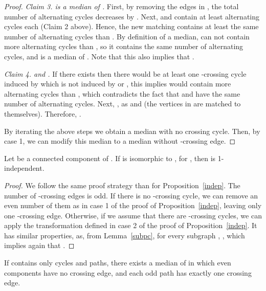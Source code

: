 \documentclass[10pt]{llncs}
\begin{document}
\begin{proof}
  {\smallskip\noindent\em Claim 3.  is a median of .}  First,
  by removing the edges in , the total number of
  alternating cycles decreases by . Next,  and 
  contain at least  alternating cycles each (Claim 2
  above). Hence, the new matching  contains at least the same
  number of alternating cycles than . By definition of a median,
   can not contain more alternating cycles than , so it
  contains the same number of alternating cycles, and is a median of
  . Note that this also implies that .
  
{\smallskip\noindent\em Claim 4.  and .}  If there exists 
  then there would be at least one -crossing cycle induced by 
  which is not induced by  or , this implies  would contain
  more alternating cycles than , which contradicts the fact
  that  and  have the same number of alternating cycles.
  Next, , as  and  (the vertices
  in  are matched to themselves). Therefore, .

  By iterating the above steps we obtain a median with no crossing
  cycle. Then, by case 1, we can modify this median to a median
  without -crossing edge. \end{proof}





\begin{proposition}\label{1dep}
  Let  be a connected component of . If  is isomorphic to
  , for , then  is 1-independent. 
\end{proposition}

\begin{proof}
  We follow the same proof strategy than for
  Proposition~\ref{indep}. The number of -crossing edges is odd. If
  there is no -crossing cycle, we can remove an even number of them
  as in case 1 of the proof of Proposition~\ref{indep}, leaving only
  one -crossing edge. Otherwise, if we assume that there are
  -crossing cycles, we can apply the transformation defined in case
  2 of the proof of Proposition~\ref{indep}. It has similar
  properties, as, from Lemma~\ref{subpc}, for every subgraph , , which implies
  again that .
\end{proof}



\begin{proposition}\label{themedian}
  If  contains only cycles and paths, there exists a median of 
  in which even components have no crossing edge, and each odd path
  has exactly one crossing edge.
\end{proposition}
\end{document}
